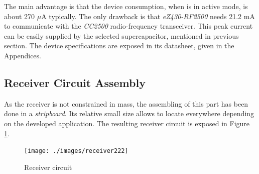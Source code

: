 The main advantage is that the device consumption, when is in active mode, is about 270 $\mu$A typically. The only drawback is that \textit{eZ430-RF2500} needs 21.2 mA to communicate with the \textit{CC2500} radio-frequency transceiver. This peak current can be easily supplied by the selected supercapacitor, mentioned in previous section. The device specifications are exposed in its datasheet, given in the Appendices.


\subsection{Receiver Circuit Assembly}

As the receiver is not constrained in mass, the assembling of this part has been done in a \textit{stripboard}. Its relative small size allows to locate everywhere depending on the developed application. The resulting receiver circuit is exposed in Figure \ref{F:receiverC}.

\begin{figure}[H] 
\begin{center}
\texttt{[image: ./images/receiver222]}
\caption{Receiver circuit}
\label{F:receiverC}
\end{center}
\end{figure}